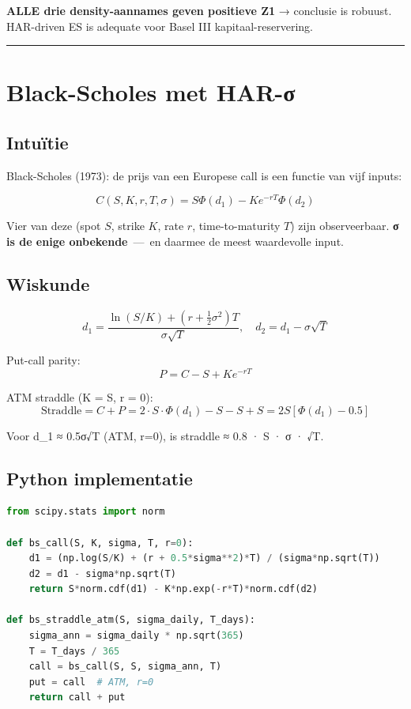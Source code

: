 \textbf{ALLE drie density-aannames geven positieve Z1} → conclusie is robuust. HAR-driven ES is adequate voor Basel III kapitaal-reservering.

\begin{center}\rule{0.5\linewidth}{0.5pt}\end{center}

\hypertarget{black-scholes-met-har-ux3c3}{%
\section{Black-Scholes met HAR-σ}\label{black-scholes-met-har-ux3c3}}

\hypertarget{intuuxeftie-11}{%
\subsection{Intuïtie}\label{intuuxeftie-11}}

Black-Scholes (1973): de prijs van een Europese call is een functie van vijf inputs:

\[C(S, K, r, T, \sigma) = S \Phi(d_1) - K e^{-rT} \Phi(d_2)\]

Vier van deze (spot \(S\), strike \(K\), rate \(r\), time-to-maturity \(T\)) zijn observeerbaar. \textbf{σ is de enige onbekende} \,---\, en daarmee de meest waardevolle input.

\hypertarget{wiskunde-4}{%
\subsection{Wiskunde}\label{wiskunde-4}}

\[d_1 = \frac{\ln(S/K) + (r + \frac{1}{2}\sigma^2)T}{\sigma \sqrt{T}}, \quad d_2 = d_1 - \sigma\sqrt{T}\]

Put-call parity:
\[P = C - S + K e^{-rT}\]

ATM straddle (K = S, r = 0):
\[\text{Straddle} = C + P = 2 \cdot S \cdot \Phi(d_1) - S - S + S = 2S[\Phi(d_1) - 0.5]\]

Voor d\_1 ≈ 0.5σ√T (ATM, r=0), is straddle ≈ 0.8 · S · σ · √T.

\hypertarget{python-implementatie-2}{%
\subsection{Python implementatie}\label{python-implementatie-2}}

\begin{lstlisting}[language=Python]
from scipy.stats import norm

def bs_call(S, K, sigma, T, r=0):
    d1 = (np.log(S/K) + (r + 0.5*sigma**2)*T) / (sigma*np.sqrt(T))
    d2 = d1 - sigma*np.sqrt(T)
    return S*norm.cdf(d1) - K*np.exp(-r*T)*norm.cdf(d2)

def bs_straddle_atm(S, sigma_daily, T_days):
    sigma_ann = sigma_daily * np.sqrt(365)
    T = T_days / 365
    call = bs_call(S, S, sigma_ann, T)
    put = call  # ATM, r=0
    return call + put
\end{lstlisting}

